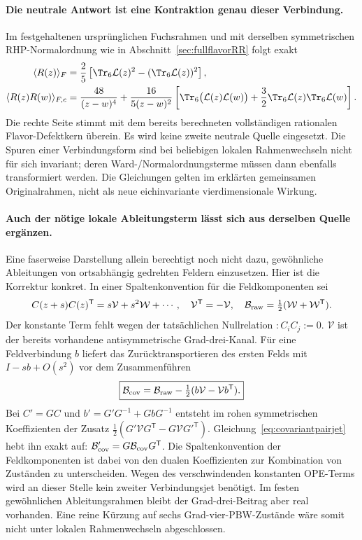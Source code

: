 \paragraph{Die neutrale Antwort ist eine Kontraktion genau dieser Verbindung.}
Im festgehaltenen ursprünglichen Fuchsrahmen und mit derselben symmetrischen
RHP-Normalordnung wie in Abschnitt~\ref{sec:fullflavorRR} folgt exakt
\begin{align}
 \langle R(z)\rangle_F
 &=\frac25\left[\Tr_6\mathcal L(z)^2-(\Tr_6\mathcal L(z))^2\right],\label{eq:massRconnection}\\
 \langle R(z)R(w)\rangle_{F,c}
 &=\frac{48}{(z-w)^4}
 +\frac{16}{5(z-w)^2}\left[\Tr_6\bigl(\mathcal L(z)\mathcal L(w)\bigr)
 +\frac32\Tr_6\mathcal L(z)\Tr_6\mathcal L(w)\right].\label{eq:massRRconnection}
\end{align}
Die rechte Seite stimmt mit dem bereits berechneten vollständigen
rationalen Flavor-Defektkern überein. Es wird keine zweite neutrale Quelle
eingesetzt. Die Spuren einer Verbindungsform sind bei beliebigen lokalen
Rahmenwechseln nicht für sich invariant; deren Ward-/Normalordnungsterme
müssen dann ebenfalls transformiert werden. Die Gleichungen gelten im
erklärten gemeinsamen Originalrahmen, nicht als neue eichinvariante
vierdimensionale Wirkung.

\paragraph{Auch der nötige lokale Ableitungsterm lässt sich aus derselben Quelle ergänzen.}
Eine faserweise Darstellung allein berechtigt noch nicht dazu, gewöhnliche
Ableitungen von ortsabhängig gedrehten Feldern einzusetzen. Hier ist die
Korrektur konkret. In einer Spaltenkonvention für die Feldkomponenten sei
\[
 C(z+s)C(z)^{\mathsf T}=s\mathcal V+s^2\mathcal W+\cdots,
 \quad \mathcal V^{\mathsf T}=-\mathcal V,
 \quad \mathcal B_{\rm raw}=\tfrac12(\mathcal W+\mathcal W^{\mathsf T}).
\]
Der konstante Term fehlt wegen der tatsächlichen Nullrelation
$:C_iC_j:=0$. $\mathcal V$ ist der bereits vorhandene antisymmetrische
Grad-drei-Kanal. Für eine Feldverbindung $b$ liefert das Zurücktransportieren
des ersten Felds mit $I-sb+O(s^2)$ vor dem Zusammenführen
\begin{equation}\label{eq:covariantpairjet}
 \boxed{\mathcal B_{\rm cov}
 =\mathcal B_{\rm raw}-\tfrac12(b\mathcal V-\mathcal V b^{\mathsf T}).}
\end{equation}
Bei $C'=GC$ und $b'=G'G^{-1}+GbG^{-1}$ entsteht im rohen symmetrischen
Koeffizienten der Zusatz
$\tfrac12(G'\mathcal V G^{\mathsf T}-G\mathcal V G'^{\mathsf T})$.
Gleichung~\eqref{eq:covariantpairjet} hebt ihn exakt auf:
$\mathcal B'_{\rm cov}=G\mathcal B_{\rm cov}G^{\mathsf T}$.
Die Spaltenkonvention der Feldkomponenten ist dabei von den dualen
Koeffizienten zur Kombination von Zuständen zu unterscheiden.
Wegen des verschwindenden konstanten OPE-Terms wird an dieser Stelle kein
zweiter Verbindungsjet benötigt. Im festen gewöhnlichen Ableitungsrahmen
bleibt der Grad-drei-Beitrag aber real vorhanden. Eine reine Kürzung auf
sechs Grad-vier-PBW-Zustände wäre somit nicht unter lokalen Rahmenwechseln
abgeschlossen.

